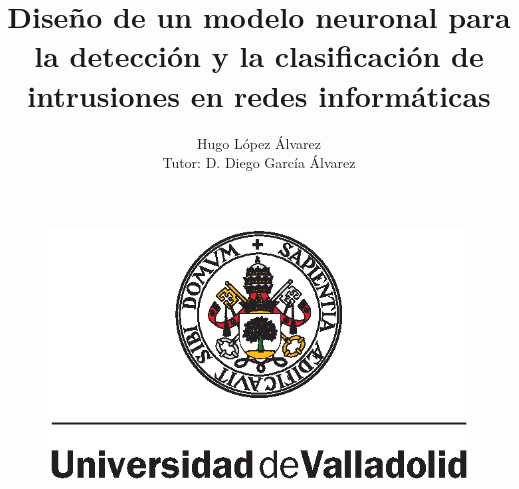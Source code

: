 \title{Diseño de un modelo neuronal para la detección y la clasificación de intrusiones en redes informáticas}
\author{Hugo López Álvarez \\ Tutor: D. Diego García Álvarez}
\date{}
\begin{frame}
    \titlepage
    \begin{figure}[H]
        \begin{center}
            \includegraphics[width=0.25\linewidth]{img/uva.eps}
        \end{center}
    \end{figure}
\end{frame}
